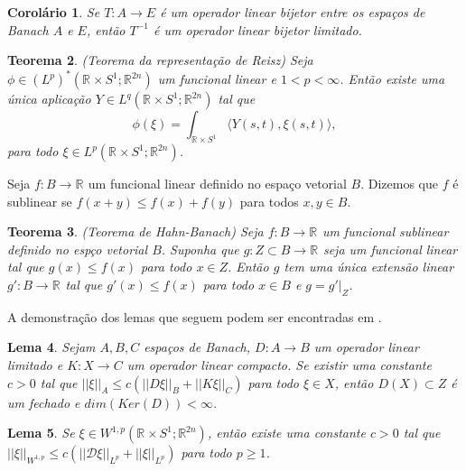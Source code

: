 \documentclass[12pt]{book}
\newtheorem{teorema}{Teorema}[section]
\newtheorem{corolario}[teorema]{Corolário}
\newtheorem{lema}[teorema]{Lema}
\newcommand{\circulo}{S^{1}}
\newcommand{\diferencialfloerabrev}{\mathcal{D}}
\newcommand{\espacoLpcontradominio}[2]{L^{p}(#1;#2)}
\newcommand{\espacoLpretacirculo}{\espacoLpcontradominio{\retacartesianocirculo}{\real{2n}}}
\newcommand{\espacoLpadjuntoretacirculo}{L^{q}(\retacartesianocirculo;\real{2n})}
\newcommand{\espacoLpdual}{(L^{p})^{*}(\retacartesianocirculo;\real{2n})}
\newcommand{\espacosobolevcontradominio}[2]{W^{1,p}(#1;#2)}
\newcommand{\norma}[1]{||#1||}
\newcommand{\normaLp}[1]{||#1||_{L^{p}}}
\newcommand{\normaWp}[1]{||#1||_{W^{1,p}}}
\newcommand{\produtointerno}[2]{\langle #1, #2 \rangle}
\newcommand{\retacartesianocirculo}{\real{} \times \circulo}
\newcommand{\real}[1]{\mathbb{R}^{#1}}
\newcommand{\reta}{\real{}}
\begin{document}
	\begin{corolario}
		 Se $T : A \to E$ é um operador linear bijetor entre os espaços de Banach $A$ e $E$, então $T^{-1}$ é um operador linear bijetor limitado.
	\end{corolario}
	
	\begin{teorema}\label{teorema_representacao_reiz}
		(Teorema da representação de Reisz) Seja $\phi \in \espacoLpdual$ um funcional linear e $1<p<\infty$. Então existe uma única aplicação $Y \in \espacoLpadjuntoretacirculo$ tal que
		$$
		\phi(\xi) = \int_{\retacartesianocirculo}\produtointerno{Y(s,t)}{\xi(s,t)},
		$$
		para todo $\xi \in \espacoLpretacirculo$.
	\end{teorema}
	
	Seja $f: B \to \reta$ um funcional linear definido no espaço vetorial $B$. Dizemos que $f$ é sublinear se $f(x+y)\leq f(x)+f(y)$ para todos $x,y \in B$.
	
	\begin{teorema}
		(Teorema de Hahn-Banach) Seja $f:B \to \reta$ um funcional sublinear definido no espço vetorial $B$. Suponha que $g:Z \subset B \to \reta$ seja um funcional linear tal que $g(x)\leq f(x)$ para todo $x \in Z$. Então $g$ tem uma única extensão linear $g': B \to \reta$ tal que $g'(x)\leq f(x)$ para todo $x \in B$ e $g=g'|_{Z}$.
	\end{teorema}
	
	
	A demonstração dos lemas que seguem podem ser encontradas em \cite{breazis_sobolev_spaces}.
	
	\begin{lema}\label{lema_operador_limitado_imagem_fechada}
		Sejam $A,B,C$ espaços de Banach, $D:A \to B$ um operador linear limitado e $K:X \to C$ um operador linear compacto. Se existir uma constante $c>0$ tal que $\norma{\xi}_{A}\leq c(\norma{D\xi}_{B}+\norma{K\xi}_{C})$ para todo $\xi \in X$, então $D(X)\subset Z$ é um fechado e $dim(Ker(D)) < \infty$.
	\end{lema}
	
	\begin{lema}\label{lema_desigualdade_inclusao_sobolev}
		Se $\xi \in \espacosobolevcontradominio{\retacartesianocirculo}{\real{2n}}$, então existe uma constante $c>0$ tal que $\normaWp{\xi}\leq c(\normaLp{\diferencialfloerabrev \xi} +\normaLp{\xi})$ para todo $p\geq 1$.
	\end{lema}
	
\end{document}
